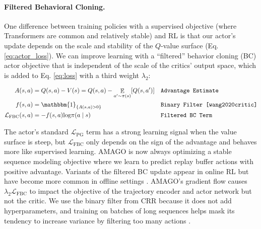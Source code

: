 \paragraph{Filtered Behavioral Cloning.} One difference between training policies with a supervised objective (where Transformers are common and relatively stable) and RL is that our actor's update depends on the scale and stability of the $Q$-value surface (Eq. \ref{eq:actor_loss}). We can improve learning with a ``filtered'' behavior cloning (BC) actor objective that is independent of the scale of the critics' output space, which is added to Eq. \ref{eq:loss} with a third weight $\lambda_2$:

\begin{align}
    A(s, a) &= Q(s, a) - V(s) = Q(s, a) - \mathop{\mathbb{E}}_{a' \sim \pi(s)}[Q(s, a')] && \text{\texttt{Advantage Estimate}} \\
    f(s, a) &= \mathbbm{1}_{\{A(s, a) > 0\}} && \text{\texttt{Binary Filter \cite{wang2020critic}}} \\
    \label{eq:fbc}
    \mathcal{L}_{\text{FBC}}(s, a) &= -f(s, a)\text{log}\pi(a \mid s) && \text{\texttt{Filtered BC Term}}
\end{align}

The actor's standard $\mathcal{L}_{\text{PG}}$ term has a strong learning signal when the value surface is steep, but $\mathcal{L}_{\text{FBC}}$ only depends on the sign of the advantage and behaves more like supervised learning. AMAGO is now always optimizing a stable sequence modeling objective where we learn to predict replay buffer actions with positive advantage. Variants of the filtered BC update appear in online RL but have become more common in offline settings \cite{levine2020offline, nair2020awac}. AMAGO's gradient flow causes $\lambda_2 \mathcal{L}_{\text{FBC}}$ to impact the objective of the trajectory encoder and actor network but not the critic. We use the binary filter from CRR \cite{wang2020critic} because it does not add hyperparameters, and training on batches of long sequences helps mask its tendency to increase variance by filtering too many actions \cite{grigsby2021closer}.

